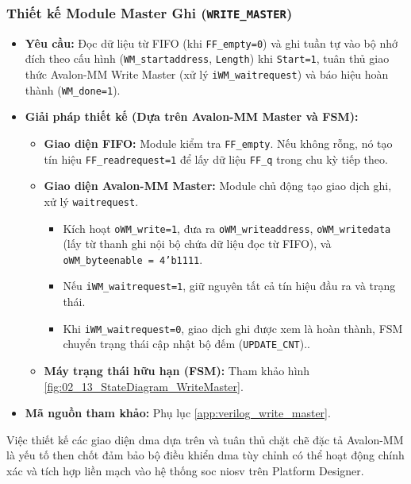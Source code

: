 \subsubsection{Thiết kế Module Master Ghi (\texttt{WRITE\_MASTER})}
\begin{itemize}
    \item \textbf{Yêu cầu:} Đọc dữ liệu từ FIFO (khi \texttt{FF\_empty=0}) và ghi tuần tự vào bộ nhớ đích theo cấu hình (\texttt{WM\_startaddress}, \texttt{Length}) khi \texttt{Start=1}, tuân thủ giao thức Avalon-MM Write Master (xử lý \texttt{iWM\_waitrequest}) và báo hiệu hoàn thành (\texttt{WM\_done=1}).
    \item \textbf{Giải pháp thiết kế (Dựa trên Avalon-MM Master và FSM):}
        \begin{itemize}
            \item \textbf{Giao diện FIFO:} Module kiểm tra \texttt{FF\_empty}. Nếu không rỗng, nó tạo tín hiệu \texttt{FF\_readrequest=1} để lấy dữ liệu \texttt{FF\_q} trong chu kỳ tiếp theo.
            \item \textbf{Giao diện Avalon-MM Master:} Module chủ động tạo giao dịch ghi, xử lý \texttt{waitrequest}.
            \begin{itemize}
                \item Kích hoạt \texttt{oWM\_write=1}, đưa ra \texttt{oWM\_writeaddress}, \texttt{oWM\_writedata} (lấy từ thanh ghi nội bộ chứa dữ liệu đọc từ FIFO), và \texttt{oWM\_byteenable = 4'b1111}.
                \item Nếu \texttt{iWM\_waitrequest=1}, giữ nguyên tất cả tín hiệu đầu ra và trạng thái.
                \item Khi \texttt{iWM\_waitrequest=0}, giao dịch ghi được xem là hoàn thành, FSM chuyển trạng thái cập nhật bộ đếm (\texttt{UPDATE\_CNT})..
            \end{itemize}
            \item \textbf{Máy trạng thái hữu hạn (FSM):} Tham khảo hình \ref{fig:02_13_StateDiagram_WriteMaster}.
        \end{itemize}
    \item \textbf{Mã nguồn tham khảo:} Phụ lục \ref{app:verilog_write_master}.
\end{itemize}

Việc thiết kế các giao diện \acrshort{dma} dựa trên và tuân thủ chặt chẽ đặc tả Avalon-MM \cite{avalon_mm_transfer} là yếu tố then chốt đảm bảo bộ điều khiển \acrshort{dma} tùy chỉnh có thể hoạt động chính xác và tích hợp liền mạch vào hệ thống \acrshort{soc} \acrshort{niosv} trên Platform Designer.


